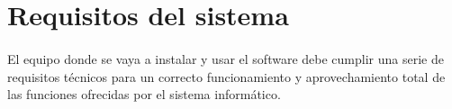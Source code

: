 \section{Requisitos del sistema}

  \paragraph{}El equipo donde se vaya a instalar y usar el software debe cumplir
  una serie de requisitos técnicos para un correcto funcionamiento y
  aprovechamiento total de las funciones ofrecidas por el sistema informático.

  
  

